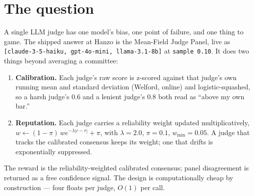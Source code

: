\documentclass[11pt]{article}
\theoremstyle{definition}
\newcommand{\mfjp}{\textsc{Mfjp}}
\begin{document}
\begin{abstract}
large win is adversarial: when responses are engineered to game a single judge, \mfjp{} scores
$0.918$ against $0.553$ for cost-matched self-consistency --- diversity, not the mean-field
machinery, is what buys this. We also report that the claimed ``free confidence signal'' is
uninformative in benign simulation ($\rho = 0.036$) and \emph{negative} under distribution
drift, though it does work on real data ($+0.331$); and that z-scoring destroys absolute
calibration: at a realistic $0.9$ base rate \mfjp{} attains $0.657$ accuracy and $0.456$ ECE
where a plain mean attains $0.979$ and $0.190$. Finally, three defects in the shipped code: the live config names a retired model so
the ``3-judge'' panel silently runs as two; the process-global mutex is held across all
sequential judge HTTP calls, serialising judged traffic for up to $90$\,s; and calibration
state is in-process only, so every deploy re-enters cold start.
\end{abstract}

\section{The question}

A single LLM judge has one model's bias, one point of failure, and one thing to game. The
shipped answer at Hanzo is the Mean-Field Judge Panel, live as
\texttt{[claude-3-5-haiku, gpt-4o-mini, llama-3.1-8b]} at \texttt{sample 0.10}. It does two
things beyond averaging a committee:

\begin{enumerate}[nosep]
\item \textbf{Calibration.} Each judge's raw score is z-scored against that judge's own
running mean and standard deviation (Welford, online) and logistic-squashed, so a harsh
judge's $0.6$ and a lenient judge's $0.8$ both read as ``above my own bar.''
\item \textbf{Reputation.} Each judge carries a reliability weight updated multiplicatively,
$w \leftarrow (1-\pi)\,w e^{-\lambda|c-r|} + \pi$, with $\lambda=2.0$, $\pi=0.1$,
$w_{\min}=0.05$. A judge that tracks the calibrated consensus keeps its weight; one that
drifts is exponentially suppressed.
\end{enumerate}

The reward is the reliability-weighted calibrated consensus; panel disagreement is returned as
a free confidence signal. The design is computationally cheap by construction --- four floats
per judge, $O(1)$ per call.
\end{document}
